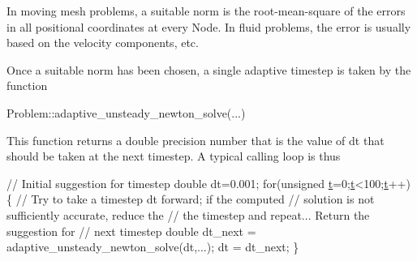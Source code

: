In moving mesh problems, a suitable norm is the root-\/mean-\/square of the errors in all positional coordinates at every {\ttfamily Node}. In fluid problems, the error is usually based on the velocity components, etc.

Once a suitable norm has been chosen, a single adaptive timestep is taken by the function 
\begin{DoxyCode}
Problem::adaptive\_unsteady\_newton\_solve(...) 
\end{DoxyCode}
 This function returns a double precision number that is the value of {\ttfamily dt} that should be taken at the next timestep. A typical calling loop is thus 
\begin{DoxyCode}
\textcolor{comment}{// Initial suggestion for timestep}
\textcolor{keywordtype}{double} dt=0.001;
\textcolor{keywordflow}{for}(\textcolor{keywordtype}{unsigned} \hyperlink{cfortran_8h_af6f0bd3dc13317f895c91323c25c2b8f}{t}=0;\hyperlink{cfortran_8h_af6f0bd3dc13317f895c91323c25c2b8f}{t}<100;\hyperlink{cfortran_8h_af6f0bd3dc13317f895c91323c25c2b8f}{t}++)
 \{
  \textcolor{comment}{// Try to take a timestep dt forward; if the computed}
  \textcolor{comment}{// solution is not sufficiently accurate, reduce the}
  \textcolor{comment}{// the timestep and repeat... Return the suggestion for}
  \textcolor{comment}{// next timestep}
  \textcolor{keywordtype}{double} dt\_next = adaptive\_unsteady\_newton\_solve(dt,...);
  dt = dt\_next;
 \}
\end{DoxyCode}


